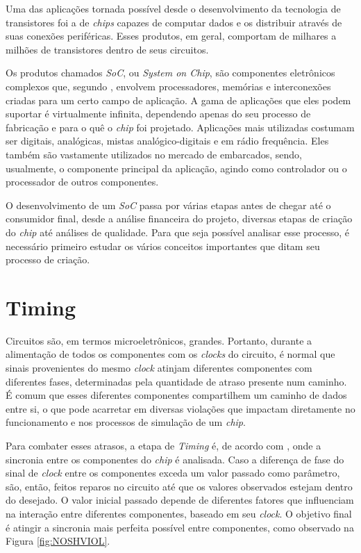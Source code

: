 \documentclass[
	12pt,				%
    oneside,			%
	a4paper,			%
	english,			%
	french,				%
	spanish,			%
	brazil				%
	]{abntex2}
\begin{document}
Uma das aplicações tornada possível desde o desenvolvimento da tecnologia de transistores foi a de \textit{chips} capazes de computar dados e os distribuir através de suas conexões periféricas. Esses produtos, em geral, comportam de milhares a milhões de transistores dentro de seus circuitos. 

Os produtos chamados \textit{SoC}, ou \textit{System on Chip}, são componentes eletrônicos complexos que, segundo \citeauthor{Flynn}, envolvem processadores, memórias e interconexões criadas para um certo campo de aplicação. A gama de aplicações que eles podem suportar é virtualmente infinita, dependendo apenas do seu processo de fabricação e para o quê o \textit{chip} foi projetado. Aplicações mais utilizadas costumam ser digitais, analógicas, mistas analógico-digitais e em rádio frequência. Eles também são vastamente utilizados no mercado de embarcados, sendo, usualmente, o componente principal da aplicação, agindo como controlador ou o processador de outros componentes.

O desenvolvimento de um \textit{SoC} passa por várias etapas antes de chegar até o consumidor final, desde a análise financeira do projeto, diversas etapas de criação do \textit{chip} até análises de qualidade. Para que seja possível analisar esse processo, é necessário primeiro estudar os vários conceitos importantes que ditam seu processo de criação.

\section{Timing}

Circuitos são, em termos microeletrônicos, grandes. Portanto, durante a alimentação de todos os componentes com os \textit{clocks} do circuito, é normal que sinais provenientes do mesmo \textit{clock} atinjam diferentes componentes com diferentes fases, determinadas pela quantidade de atraso presente num caminho. É comum que esses diferentes componentes compartilhem um caminho de dados entre si, o que pode acarretar em diversas violações que impactam diretamente no funcionamento e nos processos de simulação de um \textit{chip}.

Para combater esses atrasos, a etapa de \textit{Timing} é, de acordo com \citeauthor{Sridhar}, onde a sincronia entre os componentes do \textit{chip} é analisada. Caso a diferença de fase do sinal de \textit{clock} entre os componentes exceda um valor passado como parâmetro, são, então, feitos reparos no circuito até que os valores observados estejam dentro do desejado. O valor inicial passado depende de diferentes fatores que influenciam na interação entre diferentes componentes, baseado em seu \textit{clock}. O objetivo final é atingir a sincronia mais perfeita possível entre componentes, como observado na Figura \ref{fig:NOSHVIOL}.
\end{document}
